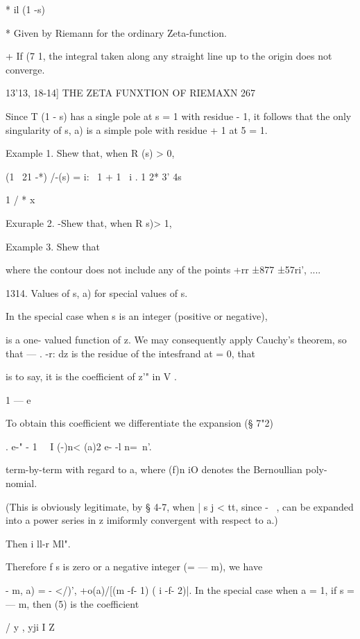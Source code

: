 * il (1 -s) 

* Given by Riemann for the ordinary Zeta-function. 

+ If (7   1, the integral taken along any straight line up to the origin does not converge. 



13'13, 18-14] THE ZETA FUNXTION OF RIEMAXN 267 

Since T (1 - s) has a single pole at s = 1 with residue - 1, it follows that 
the only singularity of   s, a) is a simple pole with residue + 1 at 5 = 1. 

Example 1. Shew that, when R (s) > 0, 

(1 \  21 -*) /-(s) = i: \  1 + 1 \  i . 
1  2* 3' 4s ~ 



1 / * x ~  



Exuraple 2. -Shew that, when R s)> 1, 

Example 3. Shew that 

where the contour does not include any of the points +rr  ±877  ±57ri', .... 

1314. Values of   s, a) for special values of s. 

In the special case when s is an integer (positive or negative),   

is a one- valued function of z. We may consequently apply Cauchy's theorem, 
so that   — .  -r: dz is the residue of the intesfrand at   = 0, that 

is to say, it is the coefficient of z'" in V  . 

1 — e~  

To obtain this coefficient we differentiate the expansion (§ 7"2) 

. e-"  - 1 \ \  I (-)n<  (a)2  
e- -l n=\ n'. 

term-by-term with regard to a, where (f)n iO denotes the Bernoullian poly- 
nomial. 

(This is obviously legitimate, by § 4-7, when | s j <  tt, since - \ , can be expanded 
into a power series in z imiformly convergent with respect to a.) 

Then i ll-r Ml". 

Therefore f s is zero or a negative integer (= — m), we have 

  - m, a) = - </)', +o(a)/[(m -f- 1) ( i -f- 2)|. 
In the special case when a = 1, if s = — m, then  (5) is the coefficient 

/  y , yji I Z 

